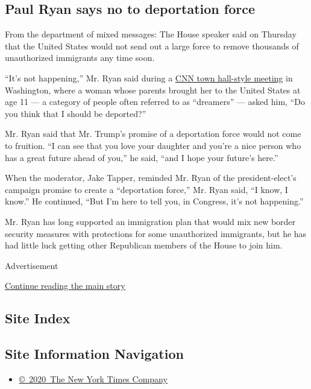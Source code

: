 \hypertarget{paul-ryan-says-no-to-deportation-force}{%
\subsection{Paul Ryan says no to deportation
force}\label{paul-ryan-says-no-to-deportation-force}}

From the department of mixed messages: The House speaker said on
Thursday that the United States would not send out a large force to
remove thousands of unauthorized immigrants any time soon.

``It's not happening,'' Mr. Ryan said during a
\href{http://www.cnn.com/2017/01/12/politics/paul-ryan-town-hall/index.html}{CNN
town hall-style meeting} in Washington, where a woman whose parents
brought her to the United States at age 11 --- a category of people
often referred to as ``dreamers'' --- asked him, ``Do you think that I
should be deported?''

Mr. Ryan said that Mr. Trump's promise of a deportation force would not
come to fruition. ``I can see that you love your daughter and you're a
nice person who has a great future ahead of you,'' he said, ``and I hope
your future's here.''

When the moderator, Jake Tapper, reminded Mr. Ryan of the
president-elect's campaign promise to create a ``deportation force,''
Mr. Ryan said, ``I know, I know.'' He continued, ``But I'm here to tell
you, in Congress, it's not happening.''

Mr. Ryan has long supported an immigration plan that would mix new
border security measures with protections for some unauthorized
immigrants, but he has had little luck getting other Republican members
of the House to join him.

Advertisement

\protect\hyperlink{after-bottom}{Continue reading the main story}

\hypertarget{site-index}{%
\subsection{Site Index}\label{site-index}}

\hypertarget{site-information-navigation}{%
\subsection{Site Information
Navigation}\label{site-information-navigation}}

\begin{itemize}
\tightlist
\item
  \href{https://help.nytimes.com/hc/en-us/articles/115014792127-Copyright-notice}{©~2020~The
  New York Times Company}
\end{itemize}

